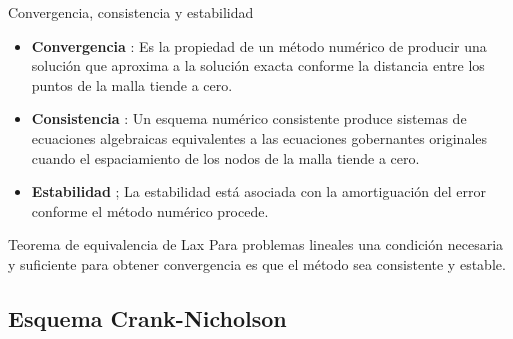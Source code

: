 \documentclass{beamer}
\begin{document}
\begin{frame}{Convergencia, consistencia y estabilidad}
\begin{itemize}
\item \textbf{Convergencia} : 
Es la propiedad de un m\'etodo num\'erico de producir una soluci\'on 
que aproxima a la soluci\'on exacta conforme la distancia entre los 
puntos de la malla tiende a cero. 
\item \textbf{Consistencia} :
Un esquema num\'erico consistente produce sistemas de ecuaciones 
algebraicas equivalentes a las ecuaciones gobernantes originales 
cuando el espaciamiento de los nodos de la malla tiende a cero. 
\item \textbf{Estabilidad} ;
La estabilidad est\'a asociada con la amortiguaci\'on del error 
conforme el m\'etodo num\'erico procede. 
\end{itemize}

\begin{block}{Teorema de equivalencia de Lax}
Para problemas lineales una condici\'on necesaria y suficiente 
para obtener convergencia es que el m\'etodo sea consistente y estable. 
\end{block}

\end{frame}

\subsection{Esquema Crank-Nicholson}

\begin{frame}
\begin{center}
\end{center}
\end{frame}
\end{document}
